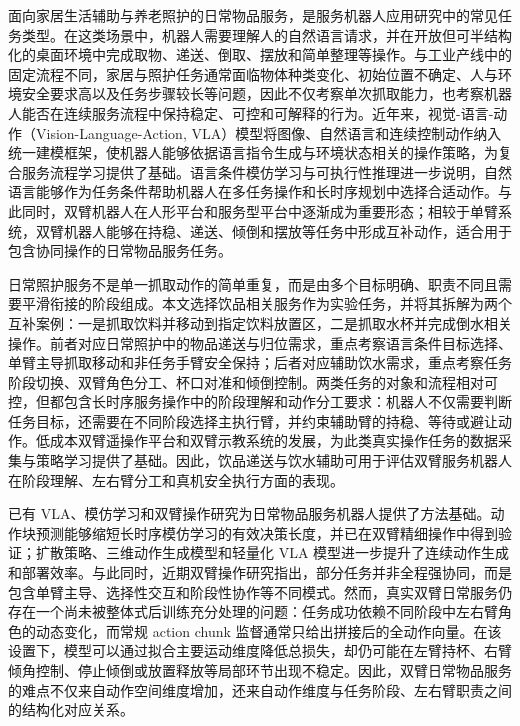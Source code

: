 \documentclass[UTF8,a4paper,zihao=5,scheme=chinese]{ctexart}
\numberwithin{figure}{section}
\numberwithin{table}{section}
\begin{document}
面向家居生活辅助与养老照护的日常物品服务，是服务机器人应用研究中的常见任务类型。在这类场景中，机器人需要理解人的自然语言请求，并在开放但可半结构化的桌面环境中完成取物、递送、倒取、摆放和简单整理等操作。与工业产线中的固定流程不同，家居与照护任务通常面临物体种类变化、初始位置不确定、人与环境安全要求高以及任务步骤较长等问题，因此不仅考察单次抓取能力，也考察机器人能否在连续服务流程中保持稳定、可控和可解释的行为。近年来，视觉-语言-动作（Vision-Language-Action, VLA）模型将图像、自然语言和连续控制动作纳入统一建模框架，使机器人能够依据语言指令生成与环境状态相关的操作策略，为复合服务流程学习提供了基础\cite{rt1,rt2,openx,openvla,octo}。语言条件模仿学习与可执行性推理进一步说明，自然语言能够作为任务条件帮助机器人在多任务操作和长时序规划中选择合适动作\cite{bcz,lcil,saycan}。与此同时，双臂机器人在人形平台和服务型平台中逐渐成为重要形态；相较于单臂系统，双臂机器人能够在持稳、递送、倾倒和摆放等任务中形成互补动作，适合用于包含协同操作的日常物品服务任务。

日常照护服务不是单一抓取动作的简单重复，而是由多个目标明确、职责不同且需要平滑衔接的阶段组成。本文选择饮品相关服务作为实验任务，并将其拆解为两个互补案例：一是抓取饮料并移动到指定饮料放置区，二是抓取水杯并完成倒水相关操作。前者对应日常照护中的物品递送与归位需求，重点考察语言条件目标选择、单臂主导抓取移动和非任务手臂安全保持；后者对应辅助饮水需求，重点考察任务阶段切换、双臂角色分工、杯口对准和倾倒控制。两类任务的对象和流程相对可控，但都包含长时序服务操作中的阶段理解和动作分工要求：机器人不仅需要判断任务目标，还需要在不同阶段选择主执行臂，并约束辅助臂的持稳、等待或避让动作。低成本双臂遥操作平台和双臂示教系统的发展，为此类真实操作任务的数据采集与策略学习提供了基础\cite{act,mobilealoha,aloha2}。因此，饮品递送与饮水辅助可用于评估双臂服务机器人在阶段理解、左右臂分工和真机安全执行方面的表现。

已有 VLA、模仿学习和双臂操作研究为日常物品服务机器人提供了方法基础。动作块预测能够缩短长时序模仿学习的有效决策长度，并已在双臂精细操作中得到验证\cite{act}；扩散策略、三维动作生成模型和轻量化 VLA 模型进一步提升了连续动作生成和部署效率\cite{diffusionpolicy,dp3,rdt,tinyvla}。与此同时，近期双臂操作研究指出，部分任务并非全程强协同，而是包含单臂主导、选择性交互和阶段性协作等不同模式\cite{rethinkingbimanual,yoto,dualarmtransformer,daiss}。然而，真实双臂日常服务仍存在一个尚未被整体式后训练充分处理的问题：任务成功依赖不同阶段中左右臂角色的动态变化，而常规 action chunk 监督通常只给出拼接后的全动作向量。在该设置下，模型可以通过拟合主要运动维度降低总损失，却仍可能在左臂持杯、右臂倾角控制、停止倾倒或放置释放等局部环节出现不稳定。因此，双臂日常物品服务的难点不仅来自动作空间维度增加，还来自动作维度与任务阶段、左右臂职责之间的结构化对应关系。
\end{document}
